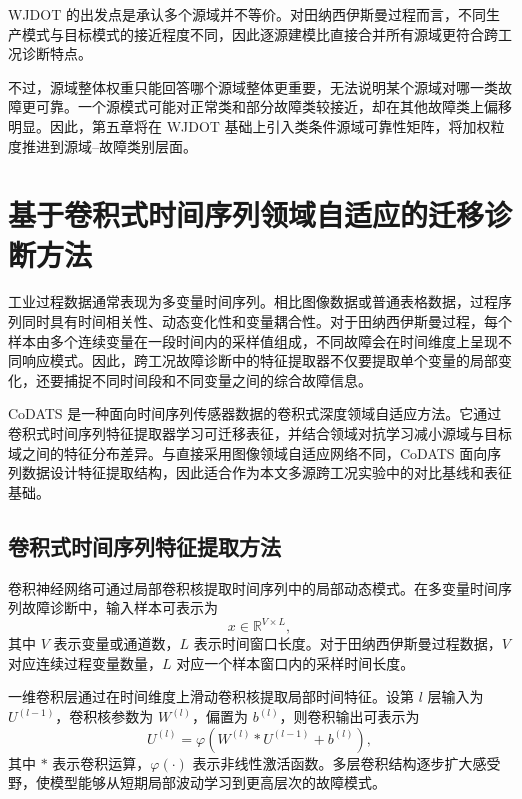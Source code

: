 \documentclass{seuthesis-2022}
\begin{document}
WJDOT 的出发点是承认多个源域并不等价。对田纳西伊斯曼过程而言，不同生产模式与目标模式的接近程度不同，因此逐源建模比直接合并所有源域更符合跨工况诊断特点。

不过，源域整体权重只能回答哪个源域整体更重要，无法说明某个源域对哪一类故障更可靠。一个源模式可能对正常类和部分故障类较接近，却在其他故障类上偏移明显。因此，第五章将在 WJDOT 基础上引入类条件源域可靠性矩阵，将加权粒度推进到源域--故障类别层面。

\section{基于卷积式时间序列领域自适应的迁移诊断方法}

工业过程数据通常表现为多变量时间序列。相比图像数据或普通表格数据，过程序列同时具有时间相关性、动态变化性和变量耦合性。对于田纳西伊斯曼过程，每个样本由多个连续变量在一段时间内的采样值组成，不同故障会在时间维度上呈现不同响应模式。因此，跨工况故障诊断中的特征提取器不仅要提取单个变量的局部变化，还要捕捉不同时间段和不同变量之间的综合故障信息。

CoDATS 是一种面向时间序列传感器数据的卷积式深度领域自适应方法。它通过卷积式时间序列特征提取器学习可迁移表征，并结合领域对抗学习减小源域与目标域之间的特征分布差异\cite{wilson2020codats}。与直接采用图像领域自适应网络不同，CoDATS 面向序列数据设计特征提取结构，因此适合作为本文多源跨工况实验中的对比基线和表征基础。

\subsection{卷积式时间序列特征提取方法}

卷积神经网络可通过局部卷积核提取时间序列中的局部动态模式。在多变量时间序列故障诊断中，输入样本可表示为
\begin{equation}
    x \in \mathbb{R}^{V \times L},
\end{equation}
其中 $V$ 表示变量或通道数，$L$ 表示时间窗口长度。对于田纳西伊斯曼过程数据，$V$ 对应连续过程变量数量，$L$ 对应一个样本窗口内的采样时间长度。

一维卷积层通过在时间维度上滑动卷积核提取局部时间特征。设第 $l$ 层输入为 $U^{(l-1)}$，卷积核参数为 $W^{(l)}$，偏置为 $b^{(l)}$，则卷积输出可表示为
\begin{equation}
    U^{(l)}
    =
    \varphi\left(W^{(l)} * U^{(l-1)} + b^{(l)}\right),
\end{equation}
其中 $*$ 表示卷积运算，$\varphi(\cdot)$ 表示非线性激活函数。多层卷积结构逐步扩大感受野，使模型能够从短期局部波动学习到更高层次的故障模式。
\end{document}
